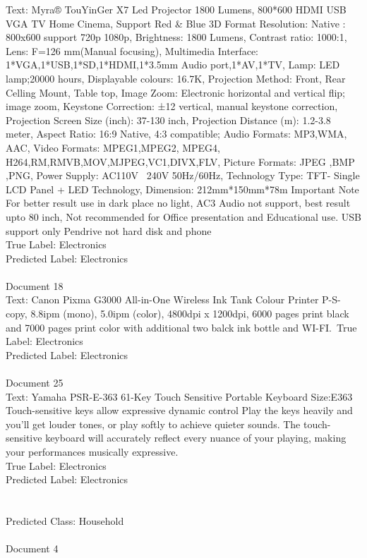 \documentclass[a4paper,12pt]{article}
\begin{document}
{Text: Myra® TouYinGer X7 Led Projector 1800 Lumens, 800*600 HDMI USB VGA TV Home Cinema, Support Red \& Blue 3D Format Resolution: Native : 800x600 support 720p 1080p, Brightness: 1800 Lumens, Contrast ratio: 1000:1, Lens: F=126 mm(Manual focusing), Multimedia Interface: 1*VGA,1*USB,1*SD,1*HDMI,1*3.5mm Audio port,1*AV,1*TV, Lamp: LED lamp;20000 hours, Displayable colours: 16.7K, Projection Method: Front, Rear Celling Mount, Table top, Image Zoom: Electronic horizontal and vertical flip; image zoom, Keystone Correction: ±12 vertical, manual keystone correction, Projection Screen Size (inch): 37-130 inch, Projection Distance (m): 1.2-3.8 meter, Aspect Ratio: 16:9 Native, 4:3 compatible; Audio Formats: MP3,WMA, AAC, Video Formats: MPEG1,MPEG2, MPEG4, H264,RM,RMVB,MOV,MJPEG,VC1,DIVX,FLV, Picture Formats: JPEG ,BMP ,PNG, Power Supply: AC110V~ 240V 50Hz/60Hz, Technology Type: TFT- Single LCD Panel + LED Technology, Dimension: 212mm*150mm*78m Important Note For better result use in dark place no light, AC3 Audio not support, best result upto 80 inch, Not recommended for Office presentation and Educational use. USB support only Pendrive not hard disk and phone\\
True Label: Electronics\\
Predicted Label: Electronics\\
\\ Document 18\\
Text: Canon Pixma G3000 All-in-One Wireless Ink Tank Colour Printer P-S-copy, 8.8ipm (mono), 5.0ipm (color), 4800dpi x 1200dpi, 6000 pages print black and 7000 pages print color with additional two balck ink bottle and WI-FI.\
True Label: Electronics\\
Predicted Label: Electronics
\\
\\Document 25\\
Text: Yamaha PSR-E-363 61-Key Touch Sensitive Portable Keyboard Size:E363   Touch-sensitive keys allow expressive dynamic control Play the keys heavily and you'll get louder tones, or play softly to achieve quieter sounds. The touch-sensitive keyboard will accurately reflect every nuance of your playing, making your performances musically expressive.\\
True Label: Electronics\\
Predicted Label: Electronics
\\
\\\\Predicted Class: Household\\
\\ Document 4\\
}
\end{document}
